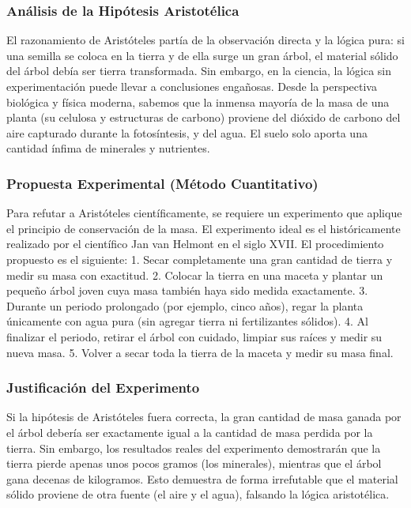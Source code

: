 \documentclass[12pt,letterpaper]{article}
\begin{document}
\subsubsection*{Análisis de la Hipótesis Aristotélica}
El razonamiento de Aristóteles partía de la observación directa y la lógica pura: si una semilla se coloca en la tierra y de ella surge un gran árbol, el material sólido del árbol debía ser tierra transformada. Sin embargo, en la ciencia, la lógica sin experimentación puede llevar a conclusiones engañosas. Desde la perspectiva biológica y física moderna, sabemos que la inmensa mayoría de la masa de una planta (su celulosa y estructuras de carbono) proviene del dióxido de carbono del aire capturado durante la fotosíntesis, y del agua. El suelo solo aporta una cantidad ínfima de minerales y nutrientes.

\subsubsection*{Propuesta Experimental (Método Cuantitativo)}
Para refutar a Aristóteles científicamente, se requiere un experimento que aplique el principio de conservación de la masa. El experimento ideal es el históricamente realizado por el científico Jan van Helmont en el siglo XVII.
El procedimiento propuesto es el siguiente:
1. Secar completamente una gran cantidad de tierra y medir su masa con exactitud.
2. Colocar la tierra en una maceta y plantar un pequeño árbol joven cuya masa también haya sido medida exactamente.
3. Durante un periodo prolongado (por ejemplo, cinco años), regar la planta únicamente con agua pura (sin agregar tierra ni fertilizantes sólidos).
4. Al finalizar el periodo, retirar el árbol con cuidado, limpiar sus raíces y medir su nueva masa.
5. Volver a secar toda la tierra de la maceta y medir su masa final.

\subsubsection*{Justificación del Experimento}
Si la hipótesis de Aristóteles fuera correcta, la gran cantidad de masa ganada por el árbol debería ser exactamente igual a la cantidad de masa perdida por la tierra. Sin embargo, los resultados reales del experimento demostrarán que la tierra pierde apenas unos pocos gramos (los minerales), mientras que el árbol gana decenas de kilogramos. Esto demuestra de forma irrefutable que el material sólido proviene de otra fuente (el aire y el agua), falsando la lógica aristotélica.
\end{document}
